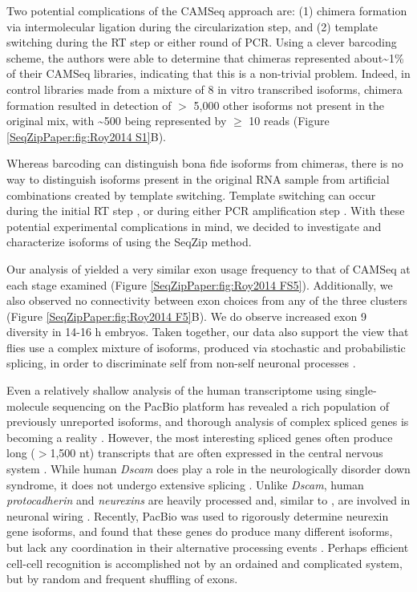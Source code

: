 		Two potential complications of the CAMSeq approach are: (1) chimera formation via intermolecular ligation during the circularization step, and (2) template switching during the RT step or either round of PCR. Using a clever barcoding scheme, the authors were able to determine that chimeras represented about\textasciitilde1\% of their CAMSeq libraries, indicating that this is a non-trivial problem. Indeed, in control libraries made from a mixture of 8 in vitro transcribed \dscam{} isoforms, chimera formation resulted in detection of $>$ 5,000 other isoforms not present in the original mix, with \textasciitilde 500 being represented by $\ge$ 10 reads (Figure \ref{SeqZipPaper:fig:Roy2014 S1}B).

		Whereas barcoding can distinguish bona fide isoforms from chimeras, there is no way to distinguish isoforms present in the original RNA sample from artificial combinations created by template switching. Template switching can occur during the initial RT step \citep{Houseley2010a}, or during either PCR amplification step \citep{Meyerhans1990a,Judo1998}. With these potential experimental complications in mind, we decided to investigate and characterize isoforms of \dscam{} using the SeqZip method.

		Our analysis of \dscam{} yielded a very similar exon usage frequency to that of CAMSeq at each stage examined (Figure \ref{SeqZipPaper:fig:Roy2014 FS5}). Additionally, we also observed no connectivity between exon choices from any of the three clusters (Figure \ref{SeqZipPaper:fig:Roy2014 F5}B). We do observe increased exon 9 diversity in 14-16 h embryos. Taken together, our data also support the view that flies use a complex mixture of \dscam{} isoforms, produced via stochastic and probabilistic splicing, in order to discriminate self from non-self neuronal processes \citep{LawrenceZipursky2013}.

		Even a relatively shallow analysis of the human transcriptome using single-molecule sequencing on the PacBio platform has revealed a rich population of previously unreported isoforms, and thorough analysis of complex spliced genes is becoming a reality \citep{Sharon2013}. However, the most interesting spliced genes often produce long ($>$1,500 nt) transcripts that are often expressed in the central nervous system \citep{Park2007}. While human \textit{Dscam} does play a role in the neurologically disorder down syndrome, it does not undergo extensive splicing \citep{Yamakawa1998a}. Unlike \textit{Dscam}, human \textit{protocadherin} and \textit{neurexins} are heavily processed and, similar to \dscam{}, are involved in neuronal wiring \citep{Ushkaryov1992,Wu1999}. Recently, PacBio was used to rigorously determine neurexin gene isoforms, and found that these genes do produce many different isoforms, but lack any coordination in their alternative processing events \citep{Treutlein2014}. Perhaps efficient cell-cell recognition is accomplished not by an ordained and complicated system, but by random and frequent shuffling of exons.

